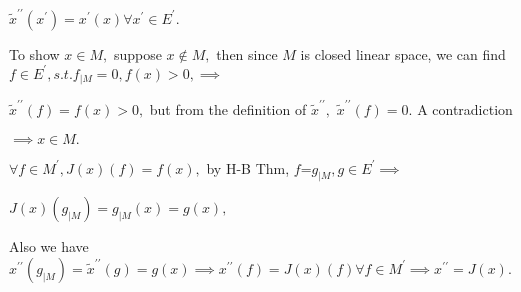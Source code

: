 \documentclass{article}
\begin{document}
$\tilde{x}^{\prime \prime }\left( x^{\prime }\right) =x^{\prime }\left(
x\right) \forall x^{\prime }\in E^{\prime }.$

To show $x\in M,$ suppose $x\notin M,$ then since $M$ is closed linear
space, we can find $f\in E^{\prime },s.t.f_{|M}=0,f\left( x\right)
>0,\implies $

$\tilde{x}^{\prime \prime }\left( f\right) =f\left( x\right) >0,$ but from
the definition of $\tilde{x}^{\prime \prime },$ $\tilde{x}^{\prime \prime
}\left( f\right) =0.$ A contradiction

$\implies x\in M.$

$\forall f\in M^{\prime },J\left( x\right) \left( f\right) =f\left( x\right)
,$ by H-B Thm, $f$=$g_{|M},g\in E^{\prime }\implies $

$J\left( x\right) \left( g_{|M}\right) =g_{|M}\left( x\right) =g\left(
x\right) ,$ 

Also we have $x^{\prime \prime }\left( g_{|M}\right) =\tilde{x}^{\prime
\prime }\left( g\right) =g\left( x\right) \implies x^{\prime \prime }\left(
f\right) =J\left( x\right) \left( f\right) \forall f\in M^{\prime }\implies
x^{\prime \prime }=J\left( x\right) .$
\end{document}
